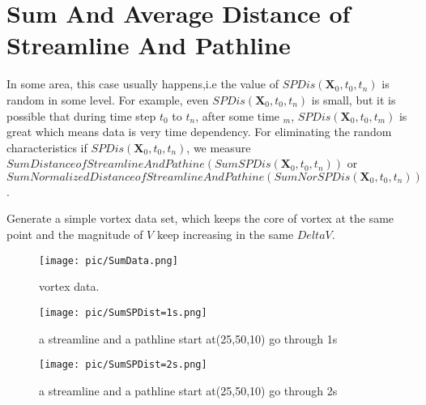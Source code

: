 \documentclass[
     11pt,         %
     a4paper,      %
     oneside,
     ]{article}
\newcommand{\vect}[1]{\boldsymbol{#1}}
\begin{document}
\section{Sum And Average Distance of Streamline And Pathline}

	In some area, this case usually happens,i.e the value of $SPDis(\vect{X}_{0},t_{0},t_{n})$ is random in some level. For example, even $SPDis(\vect{X}_{0},t_{0},t_{n})$ is small, but it is possible that during time step $t_{0}$ to $t_{n}$, after some time  $_{m}$, $SPDis(\vect{X}_{0},t_{0},t_{m})$ is great which means data is very time dependency. For eliminating the random characteristics if $SPDis(\vect{X}_{0},t_{0},t_{n})$, we measure $Sum Distance of Streamline And Pathine (SumSPDis(\vect{X}_{0},t_{0},t_{n}))$ or  $Sum Normalized Distance of Streamline And Pathine (SumNorSPDis(\vect{X}_{0},t_{0},t_{n}))$.

	Generate a simple vortex data set, which keeps the core of vortex at the same point and the magnitude of $V$ keep increasing in the same $Delta V$.\\ 
	\begin{figure}[H]
		\centering
		\texttt{[image: pic/SumData.png]}
		\caption{{\tiny vortex data.}}
		\label{fig:SumVortexData}
	\end{figure}
		\begin{figure}[H]
			\centering
			\begin{minipage}{0.45\textwidth}
				\centering
				\texttt{[image: pic/SumSPDist=1s.png]}
				\caption{\tiny a streamline and a pathline start at(25,50,10) go through 1s }
				\label{fig:SumSPDist=1s}
			\end{minipage}
				\begin{minipage}{0.45\textwidth}
					\centering
					\texttt{[image: pic/SumSPDist=2s.png]}
					\caption{\tiny a streamline and a pathline start at(25,50,10) go through 2s }
					\label{fig:SumSPDist=2s}
				\end{minipage}
		\end{figure}
\end{document}
